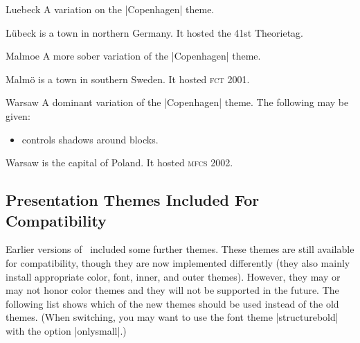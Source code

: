 \begin{themeexample}{Luebeck}
  A variation on the |Copenhagen| theme.

  L\"ubeck is a town in northern Germany. It hosted the 41st Theorietag.
\end{themeexample}

\begin{themeexample}{Malmoe}
  A more sober variation of the |Copenhagen| theme.

  Malm\"o is a town in southern Sweden. It hosted \textsc{fct} 2001.
\end{themeexample}

\begin{themeexample}{Warsaw}
  A dominant variation of the |Copenhagen| theme. The following  may be given:
  \begin{itemize}
  \item {} controls shadows around blocks.
  \end{itemize}

  Warsaw is the capital of Poland. It hosted \textsc{mfcs} 2002.
\end{themeexample}


\subsection{Presentation Themes Included For Compatibility}

Earlier versions of \beamer\ included some further themes. These themes are still available for compatibility, though they are now implemented differently (they also mainly install appropriate color, font, inner, and outer themes). However, they may or may not honor color themes and they will not be supported in the future. The following list shows which of the new themes should be used instead of the old themes. (When switching, you may want to use the font theme |structurebold| with the option |onlysmall|.)

